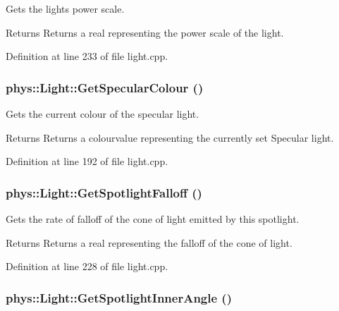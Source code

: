 Gets the lights power scale. 

\begin{DoxyReturn}{Returns}
Returns a real representing the power scale of the light. 
\end{DoxyReturn}


Definition at line 233 of file light.cpp.

\hypertarget{classphys_1_1Light_abaf4675bac9f769706f91ccacfdd278e}{
\subsubsection[{GetSpecularColour}]{ phys::Light::GetSpecularColour ()}}
\label{dc/df1/classphys_1_1Light_abaf4675bac9f769706f91ccacfdd278e}


Gets the current colour of the specular light. 

\begin{DoxyReturn}{Returns}
Returns a colourvalue representing the currently set Specular light. 
\end{DoxyReturn}


Definition at line 192 of file light.cpp.

\hypertarget{classphys_1_1Light_a498e84301731cb0cc9fa7c75cb0d752c}{
\subsubsection[{GetSpotlightFalloff}]{ phys::Light::GetSpotlightFalloff ()}}
\label{dc/df1/classphys_1_1Light_a498e84301731cb0cc9fa7c75cb0d752c}


Gets the rate of falloff of the cone of light emitted by this spotlight. 

\begin{DoxyReturn}{Returns}
Returns a real representing the falloff of the cone of light. 
\end{DoxyReturn}


Definition at line 228 of file light.cpp.

\hypertarget{classphys_1_1Light_ab91651e77bf290dbcf9eef005307f081}{
\subsubsection[{GetSpotlightInnerAngle}]{ phys::Light::GetSpotlightInnerAngle ()}}
\label{dc/df1/classphys_1_1Light_ab91651e77bf290dbcf9eef005307f081}


